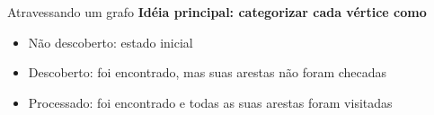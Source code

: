 \documentclass[10pt]{beamer}
\begin{document}
\begin{frame}{Atravessando um grafo}
  \huge
  \textbf{Idéia principal: categorizar cada vértice como}
  \vfill
  \Large
  \begin{itemize}
    \item Não descoberto: estado inicial
    \item Descoberto: foi encontrado, mas suas arestas não foram checadas
    \item Processado: foi encontrado e todas as suas arestas foram visitadas
  \end{itemize}
\end{frame}
\end{document}
